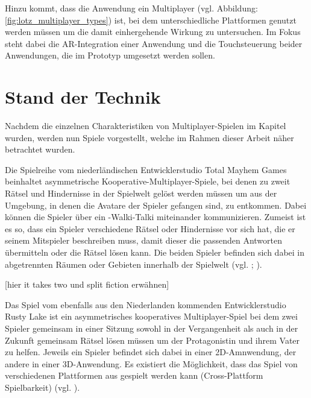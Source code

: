 Hinzu kommt, dass die Anwendung ein  Multiplayer (vgl. Abbildung: \ref{fig:lotz_multiplayer_types}) ist, bei dem unterschiedliche Plattformen genutzt werden müssen um die damit einhergehende Wirkung zu untersuchen.  Im Fokus steht dabei die \ac{AR}-Integration einer Anwendung und die Touchsteuerung beider Anwendungen, die im Prototyp umgesetzt werden sollen.


\chapter{Stand der Technik} \label{sec:sota}

Nachdem die einzelnen Charakteristiken von Multiplayer-Spielen im Kapitel \emph{} wurden, werden nun Spiele vorgestellt, welche im Rahmen dieser Arbeit näher betrachtet wurden.

Die Spielreihe  vom niederländischen Entwicklerstudio Total Mayhem Games beinhaltet asymmetrische Kooperative-Multiplayer-Spiele, bei denen zu zweit Rätsel und Hindernisse in der Spielwelt gelöst werden müssen um aus der Umgebung, in denen die Avatare der Spieler gefangen sind, zu entkommen. Dabei können die Spieler über ein -Walki-Talki miteinander kommunizieren. Zumeist ist es so, dass ein Spieler verschiedene Rätsel oder Hindernisse vor sich hat, die er seinem Mitspieler beschreiben muss, damit dieser die passenden Antworten übermitteln oder die Rätsel lösen kann. Die beiden Spieler befinden sich dabei in abgetrennten Räumen oder Gebieten innerhalb der Spielwelt (vgl. \cite{noauthor_we_nodate-1}; \cite{noauthor_total_nodate}).  

[hier it takes two und split fiction erwähnen]

Das Spiel  vom ebenfalls aus den Niederlanden kommenden Entwicklerstudio Rusty Lake ist ein asymmetrisches kooperatives Multiplayer-Spiel bei dem zwei Spieler gemeinsam in einer Sitzung sowohl in der Vergangenheit als auch in der Zukunft gemeinsam Rätsel lösen müssen um der Protagonistin und ihrem Vater zu helfen. Jeweils ein Spieler befindet sich dabei in einer 2D-Amnwendung, der andere in einer 3D-Anwendung. Es existiert die Möglichkeit, dass das Spiel von verschiedenen Plattformen aus gespielt werden kann (Cross-Plattform Spielbarkeit) (vgl. \cite{noauthor_past_nodate}). 

